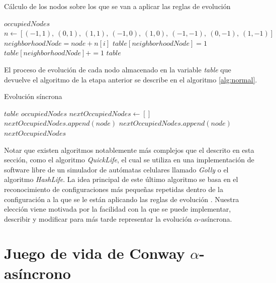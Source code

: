 \documentclass[../proyecto.tex]{memoir}
\begin{document}
\begin{algorithm}[H]
\caption{Cálculo de los nodos sobre los que se van a aplicar las reglas de evolución}
\label{alg:pre}
\begin{algorithmic}
\REQUIRE $occupiedNodes$ 
\STATE $n \leftarrow [(-1, 1),\ (0, 1),\ (1, 1),\ (-1, 0),\ (1, 0),\ (-1,-1),\ (0,-1),\ (1,-1)]$
\STATE $neighborhoodNode = node + n[i]$
\STATE $table[neighborhoodNode] = 1$
\ELSE
\STATE $table[neighborhoodNode] += 1$
\ENDIF
\ENDFOR
\ENDFOR
\RETURN $table$
\end{algorithmic}
\end{algorithm}

El proceso de evolución de cada nodo almacenado en la variable \textit{table} que devuelve el algoritmo de la etapa anterior se describe en el algoritmo \ref{alg:normal}.

\begin{algorithm}[H]
\caption{Evolución síncrona}
\label{alg:normal}
\begin{algorithmic}
\REQUIRE $table$
\REQUIRE $occupiedNodes$
\STATE $nextOccupiedNodes \leftarrow []$
\STATE $nextOccupiedNodes.append(node)$
\STATE $nextOccupiedNodes.append(node)$
\ENDIF
\ENDFOR
\RETURN $nextOccupiedNodes$
\end{algorithmic}
\end{algorithm}

Notar que existen algoritmos notablemente más complejos que el descrito en esta sección, como el algoritmo \textit{QuickLife}, el cual se utiliza en una implementación de software libre de un simulador de autómatas celulares llamado \textit{Golly} \cite{quicklife} o el algoritmo \textit{HashLife}. La idea principal de este último algoritmo se basa en el reconocimiento de configuraciones más pequeñas repetidas dentro de la configuración a la que se le están aplicando las reglas de evolución \cite{hashlife}. Nuestra elección viene motivada por la facilidad con la que se puede implementar, describir y modificar para más tarde representar la evolución $\alpha$-asíncrona.

\section{Juego de vida de Conway $\alpha$-asíncrono}
\end{document}
